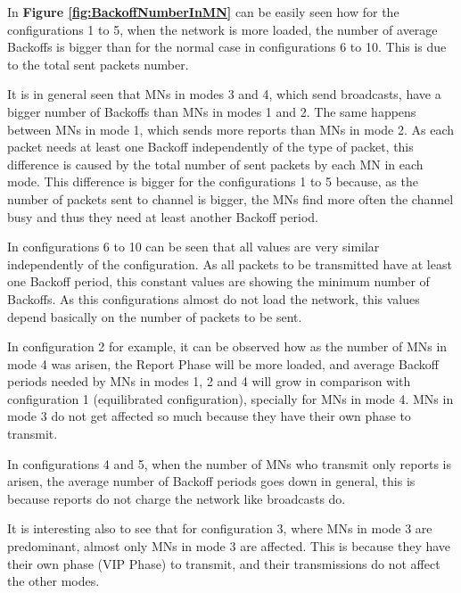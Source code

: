In \textbf{Figure \ref{fig:BackoffNumberInMN}} can be easily seen how for the configurations 1 to 5, when the network is more loaded, the number of 
average Backoffs is bigger than for the normal case in configurations 6 to 10. This is due to the total sent packets number.

It is in general seen that \acp{MN} in modes 3 and 4, which send broadcasts, have a bigger number of Backoffs than \acp{MN} in modes 1 and 2. The same 
happens between \acp{MN} in mode 1, which sends more reports than \acp{MN} in mode 2. As each packet needs at least one Backoff independently of the type of 
packet, this difference is caused by the total number of sent packets by each \ac{MN} in each mode. This difference is bigger for the configurations 1 
to 5 because, as the number of packets sent to channel is bigger, the \acp{MN} find more often the channel busy and thus they need at least another Backoff
period.

In configurations 6 to 10 can be seen that all values are very similar independently of the configuration. As all packets to be transmitted have at least
one Backoff period, this constant values are showing the minimum number of Backoffs. As this configurations almost do not load the network, this values 
depend basically on the number of packets to be sent.

In configuration 2 for example, it can be observed how as the number of \acp{MN} in mode 4 was arisen, the Report Phase will be more loaded, and average
Backoff periods needed by \acp{MN} in modes 1, 2 and 4 will grow in comparison with configuration 1 (equilibrated configuration), specially for \acp{MN} in
mode 4. \acp{MN} in mode 3 do not get affected so much because they have their own phase to transmit.

In configurations 4 and 5, when the number of \acp{MN} who transmit only reports is arisen, the average number of Backoff periods goes down in general,
this is because reports do not charge the network like broadcasts do.

It is interesting also to see that for configuration 3, where \acp{MN} in mode 3 are predominant, almost only \acp{MN} in mode 3 are affected. This is
because they have their own phase (\ac{VIP} Phase) to transmit, and their transmissions do not affect the other modes.

